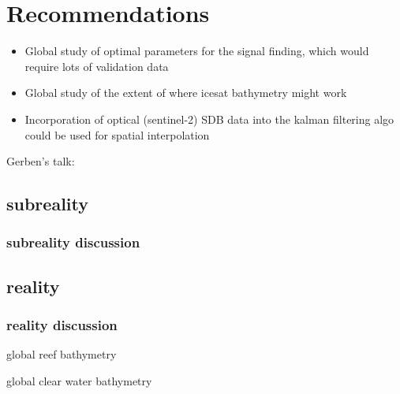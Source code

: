 \chapter{Recommendations}

\begin{itemize}
    \item Global study of optimal parameters for the signal finding, which would require lots of validation data
    \item Global study of the extent of where icesat bathymetry might work
    \item Incorporation of optical (sentinel-2) SDB data into the kalman filtering algo could be used for spatial interpolation
\end{itemize}

Gerben's talk:

\section{subreality}
\subsection{subreality discussion}

\section{reality}
\subsection{reality discussion}
global reef bathymetry

global clear water bathymetry 